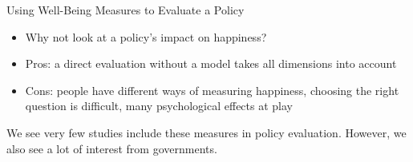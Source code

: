 \documentclass[handout]{beamer}
\begin{document}
\begin{frame}{Using Well-Being Measures to Evaluate a Policy}

\begin{itemize}
\item Why not look at a policy's impact on happiness?
\item Pros: a direct evaluation without a model takes all dimensions into account
\item Cons: people have different ways of measuring happiness, choosing the right question is difficult, many psychological effects at play
\end{itemize}

We see very few studies include these measures in policy evaluation. However, we also see a lot of interest from governments. 
\end{frame}
\end{document}
